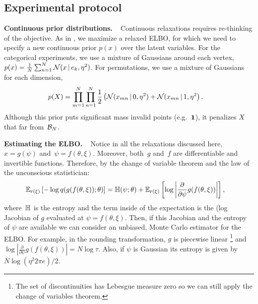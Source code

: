 \documentclass[twoside]{article}
\DeclareRobustCommand{\parhead}[1]{\textbf{#1}~}
\begin{document}
\subsection{Experimental protocol}
\label{sub:protocol}
\parhead{Continuous prior distributions. } Continuous relaxations requires
re-thinking of the objective. As in \cite{maddison2016concrete}, we
maximize a relaxed ELBO, for which we need to specify a new continuous
prior $p(x)$ over the latent variables.
For the categorical experiments, we use a mixture of Gaussians around
each vertex,~${p(x) = \tfrac{1}{N} \sum_{n=1}^N \mathcal{N}(x \, | \, e_k, \eta^2)}$. For permutations, we use a mixture of Gaussians for each
dimension,
\begin{align}
\label{eq:permprior}
  p(X) &= \prod_{m=1}^N \prod_{n=1}^N
  \frac{1}{2} \left(\mathcal{N}(x_{mn} \, | \, 0, \eta^2) + \mathcal{N}(x_{mn} \, | \, 1, \eta^2 \right).
  \end{align}
Although this prior puts significant mass invalid points
(e.g.~$\boldsymbol{1}$), it penalizes $X$ that far from~$\mathcal{B}_N$.

\parhead{Estimating the ELBO. } Notice in all the relaxations
discussed here,~${x = g(\psi)}$ and~${\psi = f(\theta,
  \xi)}$. Moreover, both~$g$ and~$f$ are differentiable and invertible
functions. Therefore, by the change of variable theorem and the law of
the unconscious statistician:
\begin{align}
  \mathbb{E}_{r(\xi)} \left[- \log q(g(f(\theta, \xi)); \theta) \right]
  &= \mathbb{H}(\psi; \theta)+
    \mathbb{E}_{r(\xi)}\left[\log \left|\frac{\partial}{\partial \psi} g(f(\theta, \xi)) \right| \right],
  \end{align}
where~$\mathbb{H}$ is the entropy and the term inside of the expectation
is the (log Jacobian of $g$ evaluated at $\psi =
f(\theta,\xi)$. Then, if this Jacobian and the entropy of $\psi$ are
available we can consider an unbiased, Monte Carlo estimator for the ELBO.
For example, in the rounding transformation, $g$ is piecewise linear
\footnote{The set of discontinuities has Lebesgue measure zero so we
  can still apply the change of variables theorem.} and
$\log | \tfrac{\partial}{\partial \psi} g(f(\theta, \xi)) |= N\log
\tau$. Also, if $\psi$ is Gaussian its entropy is given by
$N\log(\eta^2 2\pi e )/2$.
\end{document}
